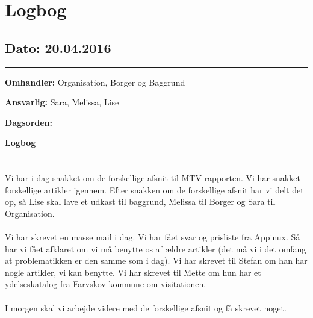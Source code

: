 \chapter{Logbog}

\section{Dato: 20.04.2016}
\hrule

\textbf{Omhandler:} Organisation, Borger og Baggrund

\textbf{Ansvarlig:} Sara, Melissa, Lise

\textbf{Dagsorden:}

\textbf{Logbog}
\\
\\ \\
Vi har i dag snakket om de forskellige afsnit til MTV-rapporten. Vi har snakket forskellige artikler igennem. Efter snakken om de forskellige afsnit har vi delt det op, så Lise skal lave et udkast til baggrund, Melissa til Borger og Sara til Organisation. 
\\ \\
Vi har skrevet en masse mail i dag. Vi har fået svar og prisliste fra Appinux. Så har vi fået afklaret om vi må benytte os af ældre artikler (det må vi i det omfang at problematikken er den samme som i dag). 
Vi har skrevet til Stefan om han har nogle artikler, vi kan benytte. 
Vi har skrevet til Mette om hun har et ydelseskatalog fra Farvskov kommune om visitationen. 
\\ \\
I morgen skal vi arbejde videre med de forskellige afsnit og få skrevet noget.  



